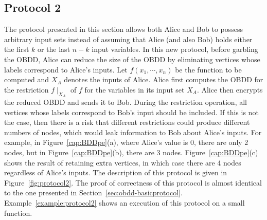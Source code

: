 \subsection{Protocol 2}
\label{subsec:protocol2}

The protocol presented in this section allows both Alice and Bob to
possess arbitrary input sets instead of assuming that Alice (and also
Bob) holds either the first $k$ or the last $n-k$ input variables.  In
this new protocol, before garbling the OBDD, Alice can reduce the size
of the OBDD by eliminating vertices whose labels correspond to Alice's
inputs.  Let $f(x_1,\cdots,x_n)$ be the function to be computed and
$X_A$ denotes the inputs of Alice. Alice first computes the OBDD  for the restriction $f
\mid_{X_A}$ of $f$ for the variables in its input
set $X_A$. Alice then encrypts the reduced OBDD and sends it to
Bob. During the restriction operation, all vertices whose labels
correspond to Bob's input should be included. If this is not the case,
then there is a risk that different restrictions could produce
different numbers of nodes, which would leak information to Bob about
Alice's inputs. For example, in Figure~\ref{cap:BDDpe}(a), where
Alice's value is $0$, there are only 2 nodes, but in
Figure~\ref{cap:BDDpe}(b), there are 3 nodes.
Figure~\ref{cap:BDDpe}(c) shows the result of retaining extra
vertices, in which case there are 4 nodes regardless of Alice's
inputs. The description of this protocol is given in
Figure~\ref{fig:protocol2}. The proof of correctness of this protocol
is almost identical to the one presented in
Section~\ref{sec:obdd-basicprotocol}. Example~\ref{example:protocol2} shows
an execution of this protocol on a small function.




